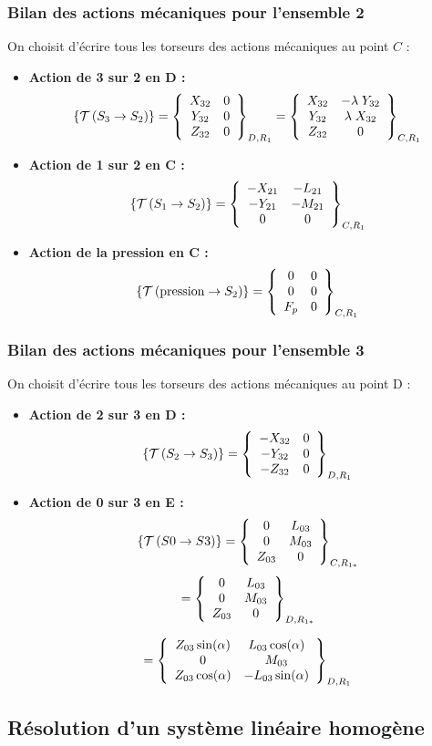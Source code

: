 \documentclass[10pt,fleqn]{article} %
\begin{document}
\subsubsection{Bilan des actions mécaniques pour l'ensemble 2}

On choisit d'écrire tous les torseurs des actions mécaniques au point $C$ :
\begin{itemize}
\item \textbf{Action de 3 sur 2 en D :}\\
$$
\torseurstat{T}{S_3}{S_2}
=\torseurcol{X_{32}}{Y_{32}}{Z_{32}}{0}{0}{0}{D,R_1}
=\torseurcol{X_{32}}{Y_{32}}{Z_{32}}{-\lambda \;Y_{32}}{\lambda \;X_{32}}{0}{C,R_1}
$$
\item \textbf{Action de 1 sur 2 en C :}\\
$$
\torseurstat{T}{S_1}{S_{2}}
=\torseurcol{-X_{21}}{-Y_{21}}{0}{-L_{21}}{-M_{21}}{0}{C,R_1}
$$

\item \textbf{Action de la pression en C :}\\
$$
\torseurstat{T}{\text{pression}}{S_{2}}
=\torseurcol{0}{0}{F_p}{0}{0}{0}{C,R_1}
$$
\end{itemize}

\subsubsection{Bilan des actions mécaniques pour l'ensemble 3}

On choisit d'écrire tous les torseurs des actions mécaniques au point D :
\begin{itemize}
\item \textbf{Action de 2 sur 3 en D :}\\
$$
\torseurstat{T}{S_2}{S_3}
=\torseurcol{-X_{32}}{-Y_{32}}{ -Z_{32}}{0}{0}{0}{D,R_1}
$$
\item \textbf{Action de 0 sur 3 en E :}\\
$$
\torseurstat{T}{S0}{S3}
=\torseurcol{0}{0}{Z_{03}}{L_{03}}{M_{03}}{0}{C,R_{1*}}
$$
$$
=\torseurcol{0}{0}{Z_{03}}{L_{03}}{M_{03}}{ 0}{D,R_{1*}}$$

$$
=\torseurcol{Z_{03}\sin(\alpha) }{ 0 }{ Z_{03}\cos(\alpha)}{L_{03}\cos(\alpha) }{ M_{03} }{ -L_{03}\sin(\alpha)}{D,R_{1}}
$$
\end{itemize}






\subsection{Résolution d'un système linéaire homogène}
\end{document}
